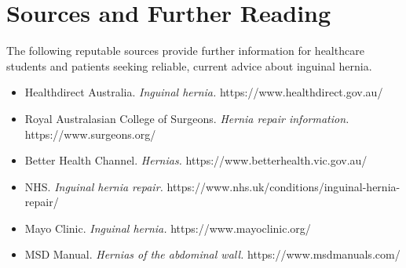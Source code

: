 \section*{Sources and Further Reading}
The following reputable sources provide further information for healthcare students and patients seeking reliable, current advice about inguinal hernia.
\begin{itemize}
    \item Healthdirect Australia. \textit{Inguinal hernia.} https://www.healthdirect.gov.au/
    \item Royal Australasian College of Surgeons. \textit{Hernia repair information.} https://www.surgeons.org/
    \item Better Health Channel. \textit{Hernias.} https://www.betterhealth.vic.gov.au/
    \item NHS. \textit{Inguinal hernia repair.} https://www.nhs.uk/conditions/inguinal-hernia-repair/
    \item Mayo Clinic. \textit{Inguinal hernia.} https://www.mayoclinic.org/
    \item MSD Manual. \textit{Hernias of the abdominal wall.} https://www.msdmanuals.com/
\end{itemize}

